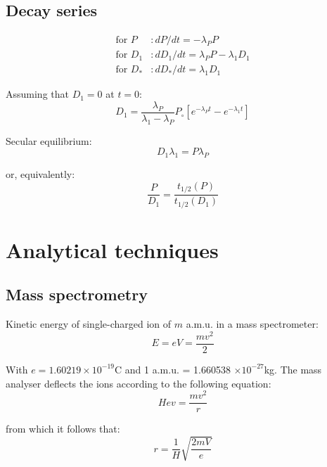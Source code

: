 \documentclass{article}
\begin{document}
\begin{multicols}{3}
\subsection{Decay series}
\label{sec:decay-series}

\begin{align}
\mbox{for~} P &: dP/dt = -\lambda_P P \label{eq:P1}\\
\mbox{for~} D_1 &: dD_1/dt = \lambda_P P - \lambda_1 D_1 \label{eq:D1}\\
\mbox{for~} D_* &: dD_*/dt = \lambda_1 D_1 \label{eq:D*}
\end{align}

Assuming that $D_1=0$ at $t=0$:
\begin{equation}
D_1 = \frac{\lambda_P}{\lambda_1 - \lambda_P} P_\circ \left[
  e^{-\lambda_P t} - e^{-\lambda_1 t}\right]
\label{eq:ND1}
\end{equation}

Secular equilibrium:
\begin{equation}
D_1 \lambda_1 = P \lambda_P
\label{eq:ND1L1}
\end{equation}

or, equivalently:
\begin{equation}
\frac{P}{D_1} = \frac{t_{1/2}(P)}{t_{1/2}(D_1)}
\label{eq:NPND1}
\end{equation}

\section{Analytical techniques}
\label{ch:analyticaltechniques}

\subsection{Mass spectrometry}
\label{sec:mass-specs}

Kinetic energy of single-charged ion of $m$ a.m.u. in a mass
spectrometer:
\begin{equation}
E = e V = \frac{m v^2}{2}
\label{eq:E}
\end{equation}

With $e = 1.60219 \times 10^{-19}$C and 1 a.m.u. = 1.660538 $\times
10^{-27}$kg. The mass analyser deflects the ions according to the
following equation:
\begin{equation}
H e v = \frac{m v^2}{r}
\label{eq:Hev}
\end{equation}

from which it follows that:
\begin{equation}
r = \frac{1}{H}\sqrt{\frac{2 m V}{e}}
\label{eq:rH}
\end{equation}


\end{multicols}
\end{document}
